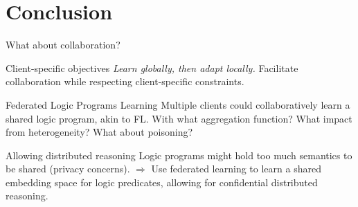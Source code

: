 \section{Conclusion}

\begin{frame}{What about collaboration?}

  \begin{block}{Client-specific objectives}
    \textit{Learn globally, then adapt locally.} Facilitate collaboration while respecting client-specific constraints.
  \end{block}

  \pause
  \begin{block}{Federated Logic Programs Learning}
    Multiple clients could collaboratively learn a shared logic program, akin to FL. 
    \pause{} With what aggregation function?
    \pause{} What impact from heterogeneity? 
    \pause{} What about poisoning?
  \end{block}

  \pause
  \begin{block}{Allowing distributed reasoning}
    Logic programs might hold too much semantics to be shared (privacy concerns).\pause{} $\Rightarrow$ Use federated learning to learn a shared embedding space for logic predicates, allowing for \alert{confidential} distributed reasoning.
  \end{block}


  
\end{frame}

